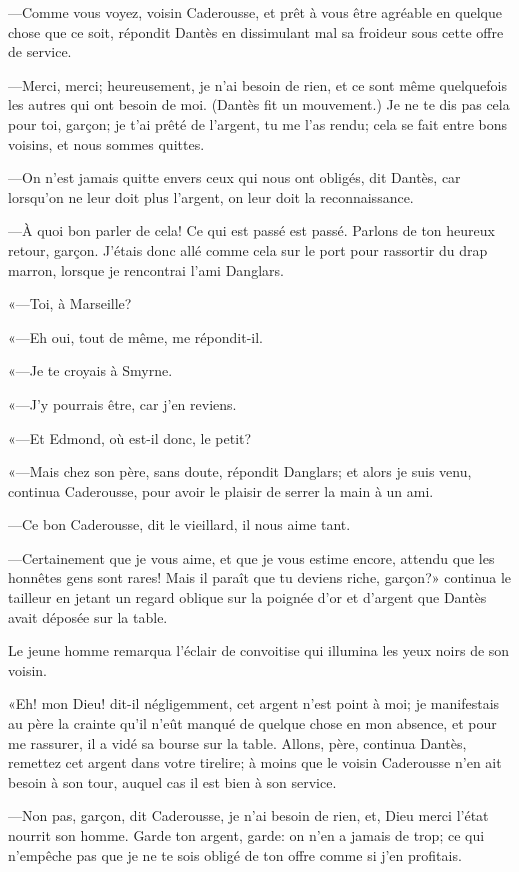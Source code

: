 —Comme vous voyez, voisin Caderousse, et prêt à vous être agréable en quelque chose que ce soit, répondit Dantès en dissimulant mal sa froideur sous cette offre de service.

—Merci, merci; heureusement, je n'ai besoin de rien, et ce sont même quelquefois les autres qui ont besoin de moi. (Dantès fit un mouvement.) Je ne te dis pas cela pour toi, garçon; je t'ai prêté de l'argent, tu me l'as rendu; cela se fait entre bons voisins, et nous sommes quittes.

—On n'est jamais quitte envers ceux qui nous ont obligés, dit Dantès, car lorsqu'on ne leur doit plus l'argent, on leur doit la reconnaissance.

—À quoi bon parler de cela! Ce qui est passé est passé. Parlons de ton heureux retour, garçon. J'étais donc allé comme cela sur le port pour rassortir du drap marron, lorsque je rencontrai l'ami Danglars.

«—Toi, à Marseille?

«—Eh oui, tout de même, me répondit-il.

«—Je te croyais à Smyrne.

«—J'y pourrais être, car j'en reviens.

«—Et Edmond, où est-il donc, le petit?

«—Mais chez son père, sans doute, répondit Danglars; et alors je suis venu, continua Caderousse, pour avoir le plaisir de serrer la main à un ami.

—Ce bon Caderousse, dit le vieillard, il nous aime tant.

—Certainement que je vous aime, et que je vous estime encore, attendu que les honnêtes gens sont rares! Mais il paraît que tu deviens riche, garçon?» continua le tailleur en jetant un regard oblique sur la poignée d'or et d'argent que Dantès avait déposée sur la table.

Le jeune homme remarqua l'éclair de convoitise qui illumina les yeux noirs de son voisin.

«Eh! mon Dieu! dit-il négligemment, cet argent n'est point à moi; je manifestais au père la crainte qu'il n'eût manqué de quelque chose en mon absence, et pour me rassurer, il a vidé sa bourse sur la table. Allons, père, continua Dantès, remettez cet argent dans votre tirelire; à moins que le voisin Caderousse n'en ait besoin à son tour, auquel cas il est bien à son service.

—Non pas, garçon, dit Caderousse, je n'ai besoin de rien, et, Dieu merci l'état nourrit son homme. Garde ton argent, garde: on n'en a jamais de trop; ce qui n'empêche pas que je ne te sois obligé de ton offre comme si j'en profitais.

